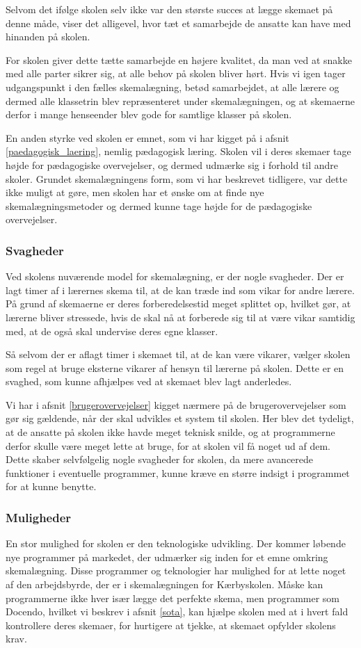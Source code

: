 Selvom det ifølge skolen selv ikke var den største succes at lægge skemaet på denne måde, viser det alligevel, hvor tæt et samarbejde de ansatte kan have med hinanden på skolen.

For skolen giver dette tætte samarbejde en højere kvalitet, da man ved at snakke med alle parter sikrer sig, at alle behov på skolen bliver hørt. Hvis vi igen tager udgangspunkt i den fælles skemalægning, betød samarbejdet, at alle lærere og dermed alle klassetrin blev repræsenteret under skemalægningen, og at skemaerne derfor i mange henseender blev gode for samtlige klasser på skolen. 

En anden styrke ved skolen er emnet, som vi har kigget på i afsnit \ref{paedagogisk_laering}, nemlig pædagogisk læring. Skolen vil i deres skemaer tage højde for pædagogiske overvejelser, og dermed udmærke sig i forhold til andre skoler. Grundet skemalægningens form, som vi har beskrevet tidligere, var dette ikke muligt at gøre, men skolen har et ønske om at finde nye skemalægningsmetoder og dermed kunne tage højde for de pædagogiske overvejelser.

\subsubsection*{Svagheder}
Ved skolens nuværende model for skemalægning, er der nogle svagheder. Der er lagt timer af i lærernes skema til, at de kan træde ind som vikar for andre lærere. På grund af skemaerne er deres forberedelsestid meget splittet op, hvilket gør, at lærerne bliver stressede, hvis de skal nå at forberede sig til at være vikar samtidig med, at de også skal undervise deres egne klasser.

Så selvom der er aflagt timer i skemaet til, at de kan være vikarer, vælger skolen som regel at bruge eksterne vikarer af hensyn til lærerne på skolen. Dette er en svaghed, som kunne afhjælpes ved at skemaet blev lagt anderledes.

Vi har i afsnit \ref{brugerovervejelser} kigget nærmere på de brugerovervejelser som gør sig gældende, når der skal udvikles et system til skolen. Her blev det tydeligt, at de ansatte på skolen ikke havde meget teknisk snilde, og at programmerne derfor skulle være meget lette at bruge, for at skolen vil få noget ud af dem. Dette skaber selvfølgelig nogle svagheder for skolen, da mere avancerede funktioner i eventuelle programmer, kunne kræve en større indsigt i programmet for at kunne benytte.

\subsubsection*{Muligheder}
En stor mulighed for skolen er den teknologiske udvikling. Der kommer løbende nye programmer på markedet, der udmærker sig inden for et emne omkring skemalægning. Disse programmer og teknologier har mulighed for at lette noget af den arbejdsbyrde, der er i skemalægningen for Kærbyskolen. Måske kan programmerne ikke hver især lægge det perfekte skema, men programmer som Docendo, hvilket vi beskrev i afsnit \ref{sota}, kan hjælpe skolen med at i hvert fald kontrollere deres skemaer, for hurtigere at tjekke, at skemaet opfylder skolens krav.

